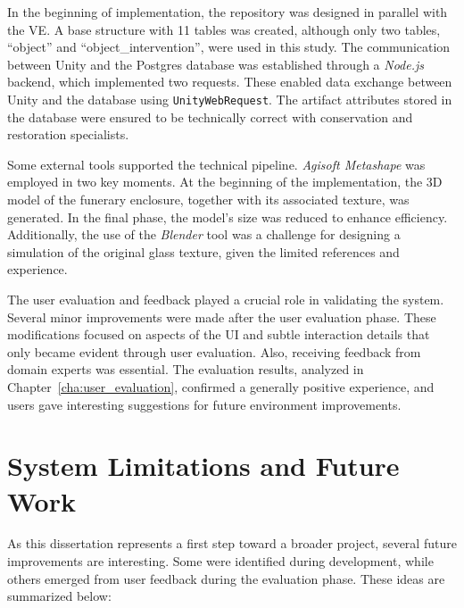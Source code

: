 In the beginning of implementation, the repository was designed in parallel with the \gls{VE}. A base structure with 11 tables was created, although only two tables, “object” and “object\_intervention”, were used in this study. The communication between Unity and the Postgres database was established through a \emph{Node.js} backend, which implemented two requests. These enabled data exchange between Unity and the database using \texttt{UnityWebRequest}. The artifact attributes stored in the database were ensured to be technically correct with conservation and restoration specialists.

Some external tools supported the technical pipeline. \emph{Agisoft Metashape} was employed in two key moments. 
At the beginning of the implementation,  the \gls{3D} model of the funerary enclosure, together with its associated texture, was generated. In the final phase, the model's size was reduced to enhance efficiency.
Additionally, the use of the \emph{Blender} tool was a challenge for designing a simulation of the original glass texture, given the limited references and experience.

The user evaluation and feedback played a crucial role in validating the system. Several minor improvements were made after the user evaluation phase. These modifications focused on aspects of the \gls{UI} and subtle interaction details that only became evident through user evaluation. Also, receiving feedback from domain experts was essential. The evaluation results, analyzed in Chapter~\ref{cha:user_evaluation}, confirmed a generally positive experience, and users gave interesting suggestions for future environment improvements.



\section{System Limitations and Future Work}
\label{sec:future}
As this dissertation represents a first step toward a broader project, several future improvements are interesting. 
Some were identified during development, while others emerged from user feedback during the evaluation phase. 
These ideas are summarized below:

